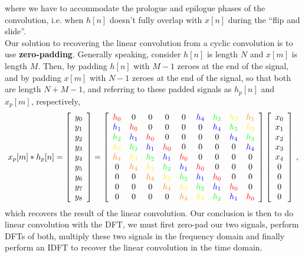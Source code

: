 %
where we have to accommodate the prologue and epilogue phases of
the convolution, i.e. when $h[n]$ doesn't fully overlap with $x[n]$
during the ``flip and slide''.\\
%
Our solution to recovering the linear convolution from a cyclic
convolution is to use \textbf{zero-padding}. Generally speaking, consider
$h[n]$ is length $N$ and $x[m]$ is length $M$. Then, by padding $h[n]$
with $M-1$ zeroes at the end of the signal, and by padding $x[m]$ with
$N-1$ zeroes at the end of the signal, so that both are length $N+M-1$,
and referring to these padded signals as $h_p[n]$ and $x_p[m]$, respectively,
%
\begin{displaymath}
  x_p[m] * h_p[n] =
  \left[\begin{array}{c}
      y_0 \\ y_1 \\ y_2 \\ y_3 \\ y_4 \\ y_5 \\ y_6 \\ y_7 \\ y_8
    \end{array}\right]
  = \left[\begin{array}{ccccccccc}
      \red{h_0} & 0 & 0 & 0 & 0 & \blu{h_4} & \grn{h_3} & \yel{h_2} & \orn{h_1} \\
      \blu{h_1} & \red{h_0} & 0 & 0 & 0 & 0 & \blu{h_4} & \grn{h_3} & \yel{h_2} \\
      \grn{h_2} & \blu{h_1} & \red{h_0} & 0 & 0 & 0 & 0 & \blu{h_4} & \grn{h_3} \\
      \yel{h_3} & \grn{h_2} & \blu{h_1} & \red{h_0} & 0 & 0 & 0 & 0 & \blu{h_4} \\
      \orn{h_4} & \yel{h_3} & \grn{h_2} & \blu{h_1} & \red{h_0} & 0 & 0 & 0 & 0 \\
      0 & \orn{h_4} & \yel{h_3} & \grn{h_2} & \blu{h_1} & \red{h_0} & 0 & 0 & 0 \\
      0 & 0 & \orn{h_4} & \yel{h_3} & \grn{h_2} & \blu{h_1} & \red{h_0} & 0 & 0 \\
      0 & 0 & 0 & \orn{h_4} & \yel{h_3} & \grn{h_2} & \blu{h_1} & \red{h_0} & 0 \\
      0 & 0 & 0 & 0 & \orn{h_4} & \yel{h_3} & \grn{h_2} & \blu{h_1} & \red{h_0}
    \end{array}\right] \left[\begin{array}{c}
      x_0 \\ x_1 \\ x_2 \\ x_3 \\ x_4 \\ 0 \\ 0 \\ 0 \\ 0
    \end{array}\right] \,,
\end{displaymath}
%
which recovers the result of the linear convolution. Our conclusion is then to do linear
convolution with the DFT, we must first zero-pad our two signals, perform
DFTs of both, multiply these two signals in the frequency domain and finally
perform an IDFT to recover the linear convolution in the time domain.

